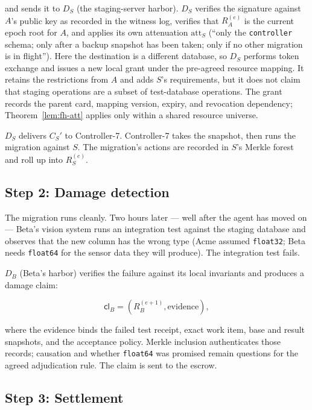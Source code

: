 \documentclass[11pt,a4paper]{article}
\theoremstyle{definition}
\theoremstyle{remark}
\begin{document}
and sends it to $D_S$ (the staging-server harbor). $D_S$ verifies the signature against $A$'s public key as recorded in the witness log, verifies that $R_A^{(e)}$ is the current epoch root for $A$, and applies its own attenuation $\mathrm{att}_S$ (``only the \texttt{controller} schema; only after a backup snapshot has been taken; only if no other migration is in flight''). Here the destination is a different database, so $D_S$ performs token exchange
and issues a new local grant under the pre-agreed resource mapping. It retains
the restrictions from $A$ and adds $S$'s requirements, but it does not claim
that staging operations are a subset of test-database operations. The grant
records the parent card, mapping version, expiry, and revocation dependency;
Theorem~\ref{lem:fh-att} applies only within a shared resource universe.

$D_S$ delivers $C_S'$ to Controller-7. Controller-7 takes the snapshot, then runs the migration against $S$. The migration's actions are recorded in $S$'s Merkle forest and roll up into $R_S^{(e)}$.

\subsection{Step 2: Damage detection}\label{sec:fh-ex-damage}

The migration runs cleanly. Two hours later --- well after the agent has moved on --- Beta's vision system runs an integration test against the staging database and observes that the new column has the wrong type (Acme assumed \texttt{float32}; Beta needs \texttt{float64} for the sensor data they will produce). The integration test fails.

$D_B$ (Beta's harbor) verifies the failure against its local invariants and produces a damage claim:

\[
\mathsf{cl}_B = (R_B^{(e+1)}, \mathrm{evidence}),
\]

where the evidence binds the failed test receipt, exact work item, base and
result snapshots, and the acceptance policy. Merkle inclusion authenticates
those records; causation and whether \texttt{float64} was promised remain
questions for the agreed adjudication rule. The claim is sent to the escrow.

\subsection{Step 3: Settlement}\label{sec:fh-ex-settle}
\end{document}
